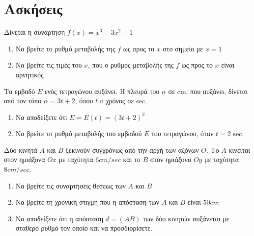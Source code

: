 \documentclass{presentation}
\begin{document}
\section{Ασκήσεις}
\begin{askisi}
  Δίνεται η συνάρτηση $f(x)=x^3-3x^2+1$
  \begin{enumerate}
    \item<1-> Να βρείτε το ρυθμό μεταβολής της $f$ ως προς το $x$ στο σημείο με $x=1$
    \item<2-> Να βρείτε τις τιμές του $x$, που ο ρυθμός μεταβολής της $f$ ως προς το $x$ είναι αρνητικός
  \end{enumerate}

\end{askisi}

\begin{askisi}
  Το εμβαδό $Ε$ ενός τετραγώνου αυξάνει. Η πλευρά του $α$ σε cm, που αυξάνει, δίνεται από τον τύπο $α=3t+2$, όπου $t$ ο χρόνος σε sec.
  \begin{enumerate}
    \item<1-> Να αποδείξετε ότι $Ε=Ε(t)=(3t+2)^2$
    \item<2-> Να βρείτε το ρυθμό μεταβολής του εμβαδού $Ε$ του τετραγώνου, όταν $t=2$ sec.
  \end{enumerate}

\end{askisi}

\begin{askisi}
  Δύο κινητά $Α$ και $Β$ ξεκινούν συγχρόνως από την αρχή των αξόνων $Ο$. Το $Α$ κινείται στον ημιάξονα $Οx$ με ταχύτητα $6cm/sec$ και το $Β$ στον ημιάξονα $Οy$ με ταχύτητα $8cm/sec$.
  \begin{enumerate}
    \item<1-> Να βρείτε τις συναρτήσεις θέσεως των $Α$ και $Β$
    \item<2-> Να βρείτε τη χρονική στιγμή που η απόσταση των $Α$ και $Β$ είναι $50cm$
    \item<3-> Να αποδείξετε ότι η απόσταση $d=(ΑΒ)$ των δύο κινητών αυξάνεται με σταθερό ρυθμό τον οποίο και να προσδιορίσετε.
  \end{enumerate}

\end{askisi}
\end{document}
